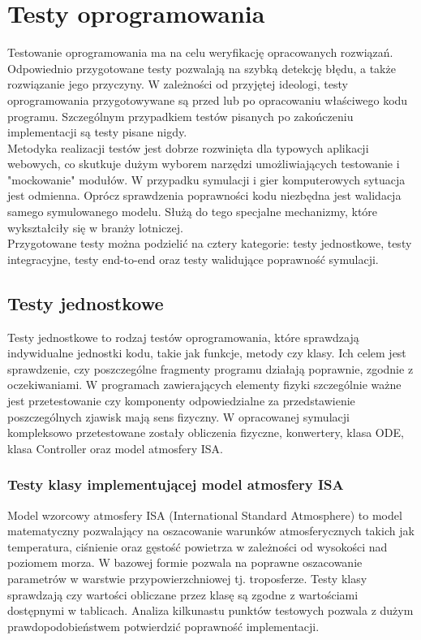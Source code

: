 \chapter{Testy oprogramowania}

Testowanie oprogramowania ma na celu weryfikację opracowanych rozwiązań. Odpowiednio przygotowane testy pozwalają na szybką detekcję błędu, a także rozwiązanie jego przyczyny. W zależności od przyjętej ideologi, testy oprogramowania przygotowywane są przed lub po opracowaniu właściwego kodu programu. Szczególnym przypadkiem testów pisanych po zakończeniu implementacji są testy pisane nigdy.\\

Metodyka realizacji testów jest dobrze rozwinięta dla typowych aplikacji webowych, co skutkuje dużym wyborem narzędzi umożliwiających testowanie i "mockowanie" modułów. W przypadku symulacji i gier komputerowych sytuacja jest odmienna. Oprócz sprawdzenia poprawności kodu niezbędna jest walidacja samego symulowanego modelu. Służą do tego specjalne mechanizmy, które wykształciły się w branży lotniczej.\\

Przygotowane testy można podzielić na cztery kategorie: testy jednostkowe, testy integracyjne, testy end-to-end oraz testy walidujące poprawność symulacji.

\section{Testy jednostkowe}

Testy jednostkowe to rodzaj testów oprogramowania, które sprawdzają indywidualne jednostki kodu, takie jak funkcje, metody czy klasy. Ich celem jest sprawdzenie, czy poszczególne fragmenty programu działają poprawnie, zgodnie z oczekiwaniami.
W programach zawierających elementy fizyki szczególnie ważne jest przetestowanie czy komponenty odpowiedzialne za przedstawienie poszczególnych zjawisk mają sens fizyczny.
W opracowanej symulacji kompleksowo przetestowane zostały obliczenia fizyczne, konwertery, klasa ODE, klasa Controller oraz model atmosfery ISA. 

\subsection{Testy klasy implementującej model atmosfery ISA}

Model wzorcowy atmosfery ISA (International Standard Atmosphere) to model matematyczny pozwalający na oszacowanie warunków atmosferycznych takich jak temperatura, ciśnienie oraz gęstość powietrza w zależności od wysokości nad poziomem morza. W bazowej formie pozwala na poprawne oszacowanie parametrów w warstwie przypowierzchniowej tj. troposferze. Testy klasy sprawdzają czy wartości obliczane przez klasę są zgodne z wartościami dostępnymi w tablicach. Analiza kilkunastu punktów testowych pozwala z dużym prawdopodobieństwem potwierdzić poprawność implementacji.

